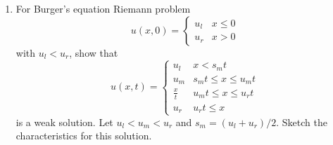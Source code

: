 \documentclass[11pt, oneside]{article}
\begin{document}
\begin{enumerate}
  \item %
    For Burger's equation Riemann problem
    \[
      u(x, 0) =
      \begin{cases}
        u_l & x \le 0 \\
        u_r & x > 0
      \end{cases}
    \]
    with $u_l < u_r$, show that
    \[
      u(x, t) =
      \begin{cases}
        u_l & x < s_m t \\
        u_m & s_m t \le x \le u_m t \\
        \frac{x}{t} & u_m t \le x \le u_r t \\
        u_r & u_r t \le x
      \end{cases}
    \]
    is a weak solution.
    Let $u_l < u_m < u_r$ and $s_m = (u_l + u_r)/2$.
    Sketch the characteristics for this solution.


\end{enumerate}
\end{document}
